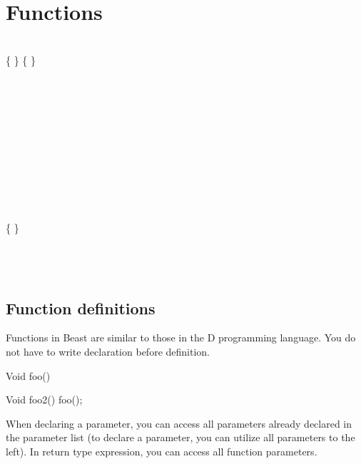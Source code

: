 \chapter{Functions}
\begin{grammar}
	     \\
	 \{  \} \kwd{\{} \{  \} \kwd{\}} \\
	  \\
		\grAltLn {} \\
		\grAltLn {} \\
		\grAltLn {} \\
		\grAltLn {} \\
		\grAltLn {} \\
		\grAltLn {} \\
		\grAltLn {} \\
	\\
	   \kwd{;} \\
	  \kwd{;} \\
	 \{  \}  \kwd{(}  \kwd{)}  \\
		 \\
	  \kwd{(}  \kwd{)}  \\
	   \kwd{;} \\
\end{grammar}

\section{Function definitions}
Functions in Beast are similar to those in the D programming language. You do not have to write declaration before definition.

\begin{code}
Void foo() {}

Void foo2() {
	foo();
}
\end{code}

When declaring a parameter, you can access all parameters already declared in the parameter list (to declare a parameter, you can utilize all parameters to the left). In return type expression, you can access all function parameters.

